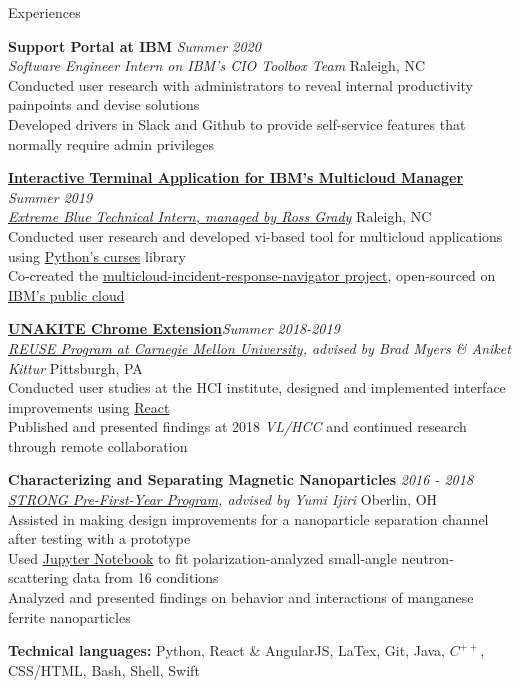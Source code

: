 \documentclass{resume}
\begin{document}
\begin{rSection}{Experiences}

{\bf Support Portal at IBM} \hfill  {\em Summer 2020} \\
{\it Software Engineer Intern on IBM's CIO Toolbox Team} \hfill { Raleigh, NC} \\
{Conducted user research with administrators to reveal internal productivity painpoints and devise solutions} \\
{Developed drivers in Slack and Github to provide self-service features that normally require admin privileges}

\href{https://github.com/IBM/multicloud-incident-response-navigator}{\bf Interactive Terminal Application for IBM's Multicloud Manager} \hfill  {\em Summer 2019} \\
\href{https://www.ibm.com/employment/extremeblue/index.html}{\em Extreme Blue Technical Intern, managed by Ross Grady} \hfill { Raleigh, NC} \\
Conducted user research and developed vi-based tool for multicloud applications using \underline{Python's curses} library\\
{Co-created the \href{https://github.com/IBM/multicloud-incident-response-navigator}{multicloud-incident-response-navigator project}, open-sourced on \href{https://github.com/IBM/multicloud-incident-response-navigator}{IBM's public cloud}} 

{\bf \href{https://unakite.info/}{UNAKITE Chrome Extension}}\hfill {\em Summer 2018-2019} \\
{\em \href{https://www.cmu.edu/scs/isr/reuse/}{REUSE Program at Carnegie Mellon University}, advised by Brad Myers \& Aniket Kittur} \hfill { Pittsburgh, PA}\\
Conducted user studies at the HCI institute, designed and implemented interface improvements using \underline{React} \\
Published and presented findings at 2018 {\em VL/HCC} and continued research through remote collaboration

{\bf Characterizing and Separating Magnetic Nanoparticles } \hfill {\em 2016 - 2018}\\
{\em \href{https://www.oberlin.edu/undergraduate-research/programs/strong}{STRONG Pre-First-Year Program}, advised by Yumi Ijiri } \hfill { Oberlin, OH}\\
Assisted in making design improvements for a nanoparticle separation channel after testing with a prototype \\
Used \underline{Jupyter Notebook} to fit polarization-analyzed small-angle neutron-scattering data from 16 conditions \\
Analyzed and presented findings on behavior and interactions of manganese ferrite nanoparticles

 \textbf{Technical languages:} {Python, React \& AngularJS, LaTex, Git, Java, {$C^{++}$}, CSS/HTML, Bash, Shell, Swift}
\end{rSection}
\end{document}
